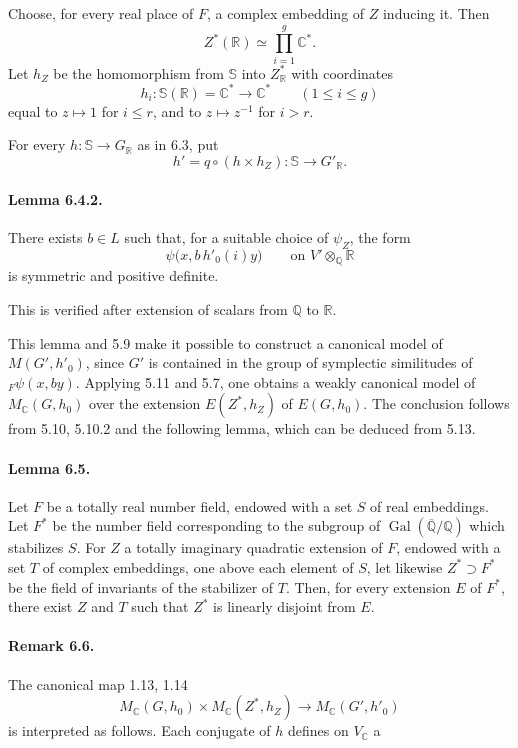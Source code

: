 \documentclass[10pt]{article}
\newcommand{\C}{\mathbb C}
\newcommand{\Q}{\mathbb Q}
\newcommand{\R}{\mathbb R}
\newcommand{\bS}{\mathbb S}
\newcommand{\Gal}{\operatorname{Gal}}
\newcommand{\MC}{M_{\C}}
\begin{document}
Choose, for every real place of $F$, a complex embedding of $Z$ inducing it. Then
\[
Z^*(\R)\simeq\prod_{i=1}^g \C^*.
\]
Let $h_Z$ be the homomorphism from $\bS$ into $Z^*_\R$ with coordinates
\[
h_i:\bS(\R)=\C^*\longrightarrow\C^*\qquad(1\le i\le g)
\]
equal to $z\mapsto1$ for $i\le r$, and to $z\mapsto z^{-1}$ for $i>r$.

For every $h:\bS\to G_\R$ as in 6.3, put
\[
h'=q\circ(h\times h_Z):\bS\longrightarrow G'_\R.
\]

\paragraph{Lemma 6.4.2.} There exists $b\in L$ such that, for a suitable choice of $\psi_Z$, the form
\[
\psi\bigl(x,b\,h'_0(i)y\bigr)\qquad\text{on }V'\otimes_\Q\R
\]
is symmetric and positive definite.

This is verified after extension of scalars from $\Q$ to $\R$.

This lemma and 5.9 make it possible to construct a canonical model of $M(G',h'_0)$, since $G'$ is contained in the group of symplectic similitudes of ${}_F\psi(x,by)$. Applying 5.11 and 5.7, one obtains a weakly canonical model of $\MC(G,h_0)$ over the extension $E(Z^*,h_Z)$ of $E(G,h_0)$. The conclusion follows from 5.10, 5.10.2 and the following lemma, which can be deduced from 5.13.

\paragraph{Lemma 6.5.} Let $F$ be a totally real number field, endowed with a set $S$ of real embeddings. Let $F^\ast$ be the number field corresponding to the subgroup of $\Gal(\overline{\Q}/\Q)$ which stabilizes $S$. For $Z$ a totally imaginary quadratic extension of $F$, endowed with a set $T$ of complex embeddings, one above each element of $S$, let likewise $Z^\ast\supset F^\ast$ be the field of invariants of the stabilizer of $T$. Then, for every extension $E$ of $F^\ast$, there exist $Z$ and $T$ such that $Z^\ast$ is linearly disjoint from $E$.

\paragraph{Remark 6.6.} The canonical map 1.13, 1.14
\[
\tag{6.6.1}
\MC(G,h_0)\times\MC(Z^*,h_Z)\longrightarrow\MC(G',h'_0)
\]
is interpreted as follows. Each conjugate of $h$ defines on $V_{\C}$ a
\end{document}
